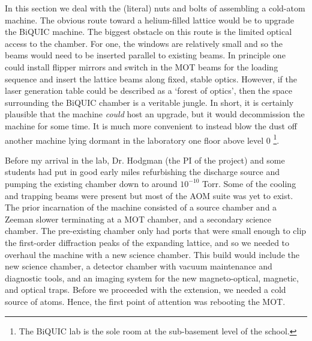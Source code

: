 	
	In this section we deal with the (literal) nuts and bolts of assembling a cold-atom machine.
	The obvious route toward a helium-filled lattice would be to upgrade the BiQUIC machine.
	The biggest obstacle on this route is the limited optical access to the chamber.
	For one, the windows are relatively small and so the beams would need to be inserted parallel to existing beams.
	In principle one could install flipper mirrors and switch in the MOT beams for the loading sequence and insert the lattice beams along fixed, stable optics.
	However, if the laser generation table could be described as a `forest of optics', then the space surrounding the BiQUIC chamber is a veritable jungle.
	In short, it is certainly plausible that the machine \emph{could} host an upgrade, but it would decommission the machine for some time.
	It is much more convenient to instead blow the dust off another machine lying dormant in the laboratory one floor above level 0 \footnote{The BiQUIC lab is the sole room at the sub-basement level of the school.}.

	Before my arrival in the lab, Dr. Hodgman (the PI of the project) and some students had put in good early miles refurbishing the discharge source and pumping the existing chamber down to around $10^{-10}$ Torr.
	Some of the cooling and trapping beams were present but most of the AOM suite was yet to exist.
	The prior incarnation of the machine consisted of a source chamber and a Zeeman slower terminating at a MOT chamber, and a secondary science chamber.
	The pre-existing chamber only had ports that were small enough to clip the first-order diffraction peaks of the expanding lattice, and so we needed to overhaul the machine 
	with a new science chamber.
	This build would include the new science chamber, a detector chamber with vacuum maintenance and diagnostic tools, and an imaging system for the new magneto-optical, magnetic, and optical traps.
	Before we proceeded with the extension, we needed a cold source of atoms. 
	Hence, the first point of attention was rebooting the MOT.

